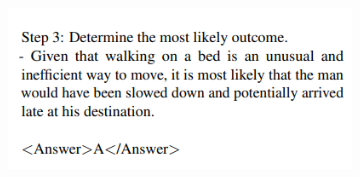 \documentclass{beamer}
\begin{document}
\begin{frame}
\begin{columns}
\begin{column}{0.5\textwidth}
\begin{figure}
\begin{subfigure}{\textwidth}
				\end{subfigure}
				\begin{subfigure}{\textwidth}
					\centering
					\includegraphics[scale=0.55]{imgs/counterfactual_prompt4.png}	
				\end{subfigure}
			\end{figure}
		\end{column}
	\end{columns}
\end{frame}
\end{document}
